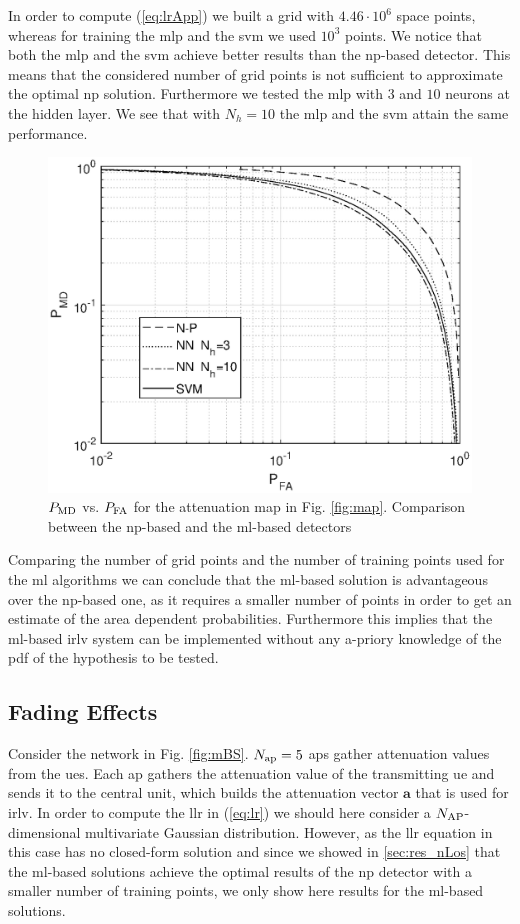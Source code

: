 \documentclass[draftcls,onecolumn,12pt]{IEEEtran}
\begin{document}
In order to compute (\ref{eq:lrApp}) we built a grid with $4.46 \cdot 10^6$ space points, whereas for training the \ac{mlp} and the \ac{svm} we used $10^3$ points. We notice that both the \ac{mlp} and the \ac{svm} achieve better results than the \ac{np}-based detector. This means that the considered number of grid points is not sufficient to approximate the optimal \ac{np} solution. Furthermore we tested the \ac{mlp} with $3$ and $10$ neurons at the hidden layer. We see that with $N_h=10$ the \ac{mlp} and the \ac{svm} attain the same performance. 

\begin{figure}[t]
    \centering
    \includegraphics[width=0.5\columnwidth]{res_NP_approx_SVM.eps}
    \caption{$P_{\rm MD}$ vs. $P_{\rm FA}$ for the attenuation map in Fig. \ref{fig:map}. Comparison between the \ac{np}-based and the \ac{ml}-based detectors}
    \label{fig:trueMap}
\end{figure}

Comparing the number of grid points and the number of training points used for the \ac{ml} algorithms we can conclude that the \ac{ml}-based solution is advantageous over the \ac{np}-based one, as it requires a smaller number of points in order to get an estimate of the area dependent probabilities. Furthermore this implies that the \ac{ml}-based \ac{irlv} system can be implemented without any a-priory knowledge of the \ac{pdf} of the hypothesis to be tested.

\subsection{Fading Effects}\label{sec:res_fading}

Consider the network in Fig. \ref{fig:mBS}. $N_{\rm ap}=5$ \acp{ap} gather attenuation values from the \acp{ue}. Each \ac{ap} gathers the attenuation value of the transmitting \ac{ue} and sends it to the central unit, which builds the attenuation vector $\bm{a}$ that is used for \ac{irlv}. In order to compute the \ac{llr} in (\ref{eq:lr}) we should here consider a $N_{\rm AP}$-dimensional multivariate Gaussian distribution. However, as the \ac{llr} equation in this case has no closed-form solution and since we showed in \ref{sec:res_nLos} that the \ac{ml}-based solutions achieve the optimal results of the \ac{np} detector with a smaller number of training points, we only show here results for the \ac{ml}-based solutions.
\end{document}
